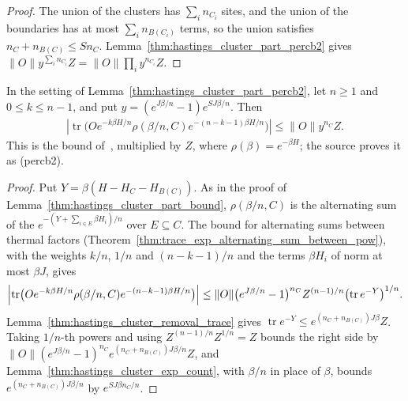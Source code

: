 \begin{proof}
    \leanok
    The union of the clusters has $\sum_in_{C_i}$ sites, and the union of the
    boundaries has at most $\sum_in_{B(C_i)}$ terms, so the union satisfies
    $n_C+n_{B(C)}\le Sn_C$. Lemma~\ref{thm:hastings_cluster_part_percb2} gives
    $\|O\|y^{\sum_in_{C_i}}Z=\|O\|\prod_iy^{n_{C_i}}Z$.
\end{proof}

\begin{lemma}
    \label{thm:hastings_cluster_part_thermal}
    \leanok
    In the setting of Lemma~\ref{thm:hastings_cluster_part_percb2}, let $n\ge1$ and
    $0\le k\le n-1$, and put $y=(e^{J\beta/n}-1)e^{SJ\beta/n}$. Then
    \begin{align}
        \left|\operatorname{tr}\bigl(Oe^{-k\beta H/n}\rho(\beta/n,C)
        e^{-(n-k-1)\beta H/n}\bigr)\right|
        \le\|O\|y^{n_C}Z.
        \label{eq:hastings_cluster_part_thermal}
    \end{align}
    This is the bound of~\cite[lines 1322--1333]{Hastings2006Solving}, multiplied by $Z$,
    where $\rho(\beta)=e^{-\beta H}$; the source proves it as (percb2).
\end{lemma}

\begin{proof}
    \leanok
    Put $Y=\beta(H-H_C-H_{B(C)})$. As in the proof of
    Lemma~\ref{thm:hastings_cluster_part_bound}, $\rho(\beta/n,C)$ is the alternating sum of
    the $e^{-(Y+\sum_{i\in E}\beta H_i)/n}$ over $E\subseteq C$. The bound for alternating
    sums between thermal factors (Theorem~\ref{thm:trace_exp_alternating_sum_between_pow}),
    with the weights $k/n$, $1/n$ and $(n-k-1)/n$ and the terms $\beta H_i$ of norm at most
    $\beta J$, gives
    \begin{align}
        \left|\operatorname{tr}\bigl(Oe^{-k\beta H/n}\rho(\beta/n,C)
        e^{-(n-k-1)\beta H/n}\bigr)\right|
        \le\|O\|\bigl(e^{J\beta/n}-1\bigr)^{n_C}Z^{(n-1)/n}
        \bigl(\operatorname{tr}e^{-Y}\bigr)^{1/n}.\notag
    \end{align}
    Lemma~\ref{thm:hastings_cluster_removal_trace} gives
    $\operatorname{tr}e^{-Y}\le e^{(n_C+n_{B(C)})J\beta}Z$. Taking
    $1/n$-th powers and using $Z^{(n-1)/n}Z^{1/n}=Z$ bounds the right side by
    $\|O\|(e^{J\beta/n}-1)^{n_C}e^{(n_C+n_{B(C)})J\beta/n}Z$, and
    Lemma~\ref{thm:hastings_cluster_exp_count}, with $\beta/n$ in place of
    $\beta$, bounds $e^{(n_C+n_{B(C)})J\beta/n}$ by $e^{SJ\beta n_C/n}$.
\end{proof}

